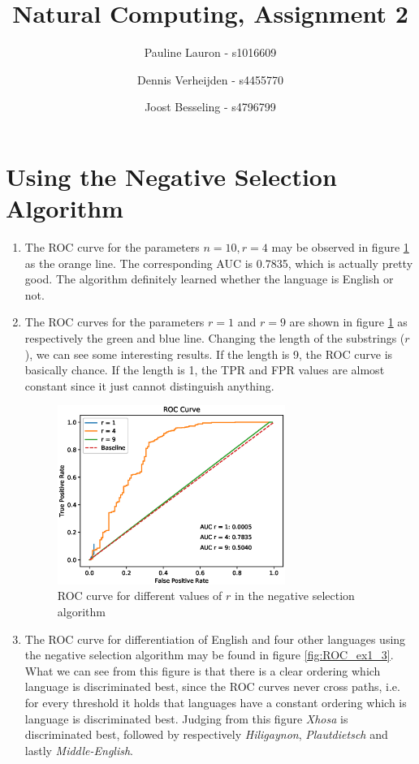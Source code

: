 \documentclass[11pt]{article}
\title{Natural Computing, Assignment 2}
\author{Pauline Lauron - s1016609 \and Dennis Verheijden - s4455770 \and Joost Besseling - s4796799}
\begin{document}
\maketitle

\section{Using the Negative Selection Algorithm}
\begin{enumerate}[1.]
\item The ROC curve for the parameters $n=10, r=4$ may be observed in figure \ref{fig:ROC_ex1} as the orange line. The corresponding AUC is 0.7835, which is actually pretty good. The algorithm definitely learned whether the language is English or not.

\item The ROC curves for the parameters $r=1$ and $r=9$ are shown in figure \ref{fig:ROC_ex1} as respectively the green and blue line. Changing the length of the substrings ($r$), we can see some interesting results. If the length is 9, the ROC curve is basically chance. If the length is 1, the TPR and FPR values are almost constant since it just cannot distinguish anything.

\begin{figure}[H]
\centering
\includegraphics[width=0.7\textwidth]{images/roc_ex1.eps}
\caption{ROC curve for different values of $r$ in the negative selection algorithm}
\label{fig:ROC_ex1}
\end{figure}

\newpage

\item The ROC curve for differentiation of English and four other languages using the negative selection algorithm may be found in figure \ref{fig:ROC_ex1_3}. What we can see from this figure is that there is a clear ordering which language is discriminated best, since the ROC curves never cross paths, i.e. for every threshold it holds that languages have a constant ordering which is language is discriminated best. Judging from this figure \textit{Xhosa} is discriminated best, followed by respectively \textit{Hiligaynon}, \textit{Plautdietsch} and lastly \textit{Middle-English}.


\end{enumerate}
\end{document}

